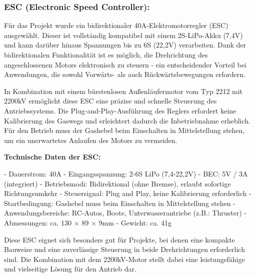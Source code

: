 \documentclass[a4paper,12pt]{article}
\begin{document}
            \newpage
            


    
        \subsubsection{ESC (Electronic Speed Controller):}


Für das Projekt wurde ein bidirektionaler 40A-Elektromotorregler (ESC) ausgewählt. Dieser ist vollständig kompatibel mit einem 2S-LiPo-Akku (7,4V) und kann darüber hinaus Spannungen bis zu 6S (22,2V) verarbeiten. Dank der bidirektionalen Funktionalität ist es möglich, die Drehrichtung des angeschlossenen Motors elektronisch zu steuern - ein entscheidender Vorteil bei Anwendungen, die sowohl Vorwärts- als auch Rückwärtsbewegungen erfordern.\newline

In Kombination mit einem bürstenlosen Außenläufermotor vom Typ 2212 mit 2200kV ermöglicht diese ESC eine präzise und schnelle Steuerung des Antriebssystems. Die Plug-and-Play-Ausführung des Reglers erfordert keine Kalibrierung des Gaswegs und erleichtert dadurch die Inbetriebnahme erheblich. Für den Betrieb muss der Gashebel beim Einschalten in Mittelstellung stehen, um ein unerwartetes Anlaufen des Motors zu vermeiden.\newline

\textbf{Technische Daten der ESC:}

- Dauerstrom: 40A\newline  
- Eingangsspannung: 2-6S LiPo (7,4-22,2V)\newline 
- BEC: 5V / 3A (integriert)\newline
- Betriebsmodi: Bidirektional (ohne Bremse), erlaubt sofortige Richtungsumkehr\newline  
- Steuersignal: Plug and Play, keine Kalibrierung erforderlich\newline
- Startbedingung: Gashebel muss beim Einschalten in Mittelstellung stehen\newline  
- Anwendungsbereiche: RC-Autos, Boote, Unterwasserantriebe (z.B.: Thruster)\newline  
- Abmessungen: ca. 130 × 89 × 9mm\newline  
- Gewicht: ca. 41g  \newline

Diese ESC eignet sich besonders gut für Projekte, bei denen eine kompakte Bauweise und eine zuverlässige Steuerung in beide Drehrichtungen erforderlich sind. Die Kombination mit dem 2200kV-Motor stellt dabei eine leistungsfähige und vielseitige Lösung für den Antrieb dar.
\end{document}
